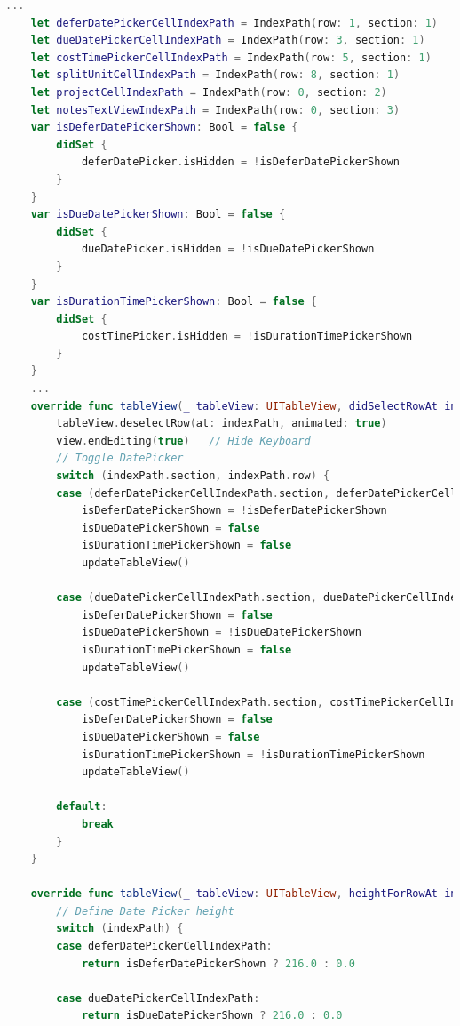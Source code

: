 \begin{lstlisting}[language={Swift}, caption={动态调整行高以便输入}]
	...
	let deferDatePickerCellIndexPath = IndexPath(row: 1, section: 1)
    let dueDatePickerCellIndexPath = IndexPath(row: 3, section: 1)
    let costTimePickerCellIndexPath = IndexPath(row: 5, section: 1)
    let splitUnitCellIndexPath = IndexPath(row: 8, section: 1)
    let projectCellIndexPath = IndexPath(row: 0, section: 2)
    let notesTextViewIndexPath = IndexPath(row: 0, section: 3)
    var isDeferDatePickerShown: Bool = false {
        didSet {
            deferDatePicker.isHidden = !isDeferDatePickerShown
        }
    }
    var isDueDatePickerShown: Bool = false {
        didSet {
            dueDatePicker.isHidden = !isDueDatePickerShown
        }
    }
    var isDurationTimePickerShown: Bool = false {
        didSet {
            costTimePicker.isHidden = !isDurationTimePickerShown
        }
    }
	...
	override func tableView(_ tableView: UITableView, didSelectRowAt indexPath: IndexPath) {
        tableView.deselectRow(at: indexPath, animated: true)
        view.endEditing(true)   // Hide Keyboard
        // Toggle DatePicker
        switch (indexPath.section, indexPath.row) {
        case (deferDatePickerCellIndexPath.section, deferDatePickerCellIndexPath.row - 1):
            isDeferDatePickerShown = !isDeferDatePickerShown
            isDueDatePickerShown = false
            isDurationTimePickerShown = false
            updateTableView()
            
        case (dueDatePickerCellIndexPath.section, dueDatePickerCellIndexPath.row - 1):
            isDeferDatePickerShown = false
            isDueDatePickerShown = !isDueDatePickerShown
            isDurationTimePickerShown = false
            updateTableView()
            
        case (costTimePickerCellIndexPath.section, costTimePickerCellIndexPath.row - 1):
            isDeferDatePickerShown = false
            isDueDatePickerShown = false
            isDurationTimePickerShown = !isDurationTimePickerShown
            updateTableView()
        
        default:
            break
        }
	}
	
	override func tableView(_ tableView: UITableView, heightForRowAt indexPath: IndexPath) -> CGFloat {
        // Define Date Picker height
        switch (indexPath) {
        case deferDatePickerCellIndexPath:
            return isDeferDatePickerShown ? 216.0 : 0.0
        
        case dueDatePickerCellIndexPath:
            return isDueDatePickerShown ? 216.0 : 0.0
        

\end{lstlisting}
